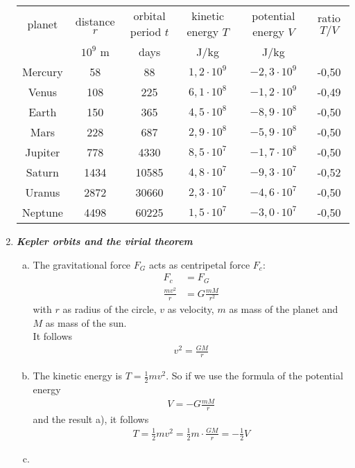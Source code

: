 \documentclass[a4paper,12pt]{article}
\newcommand{\question}[1]{\textbf{\textit{#1}}}
\begin{document}
\begin{enumerate}
		\begin{table}[h]
			\begin{center}
				\begin{tabular}{|c|cc|cc|c|}
					\hline
					planet & distance $r$ & orbital period $t$ & kinetic energy $T$ & potential energy $V$ & ratio $T/V$\\
					& $10^{9}$ m & days & J/kg & J/kg & \\
					\hline
					Mercury & 58 & 88 & $1,2\cdot 10^{9}$ & $-2,3\cdot 10^{9}$ & -0,50\\
					Venus & 108 & 225 & $6,1\cdot 10^{8}$ & $-1,2\cdot 10^{9}$ & -0,49\\
					Earth & 150 & 365 & $4,5\cdot 10^{8}$ & $-8,9\cdot 10^{8}$ & -0,50\\
					Mars & 228 & 687 & $2,9\cdot 10^{8}$ & $-5,9\cdot 10^{8}$ & -0,50 \\
					Jupiter & 778 & 4330 & $8,5\cdot 10^{7}$ & $-1,7\cdot 10^{8}$ & -0,50 \\
					Saturn & 1434 & 10585 & $4,8\cdot 10^{7}$ & $-9,3\cdot 10^{7}$ & -0,52 \\
					Uranus & 2872 & 30660 & $2,3\cdot 10^{7}$ & $-4,6\cdot 10^{7}$ & -0,50 \\
					Neptune & 4498 & 60225 & $1,5\cdot 10^{7}$ & $-3,0\cdot 10^{7}$ & -0,50 \\
					\hline
				\end{tabular}
			\end{center}
		\end{table}
		
		\setcounter{equation}{0}
		\item \question{Kepler orbits and the virial theorem}
		\begin{enumerate}[(a)]
			\item
			
			The gravitational force $F_G$ acts as centripetal force $F_c$:
			\begin{align*}
			F_c &=F_G\\
			\frac{mv^2}{r}&=G\frac{mM}{r^2}
			\end{align*}
			with $r$ as radius of the circle, $v$ as velocity, $m$ as mass of the planet and $M$ as mass of the sun.\\
			It follows
			\begin{align*}
			v^2=\frac{GM}{r}
			\end{align*}
			
			\item
			
			The kinetic energy is $T=\frac{1}{2}mv^2$. So if we use the formula of the potential energy 
			\begin{align*}
			V=-G\frac{mM}{r}
			\end{align*}
			and the result a), it follows
			\begin{align*}
			T=\frac{1}{2}mv^2=\frac{1}{2}m\cdot\frac{GM}{r}=-\frac{1}{2}V
			\end{align*}
			\item
			

\end{enumerate}
\end{enumerate}
\end{document}
